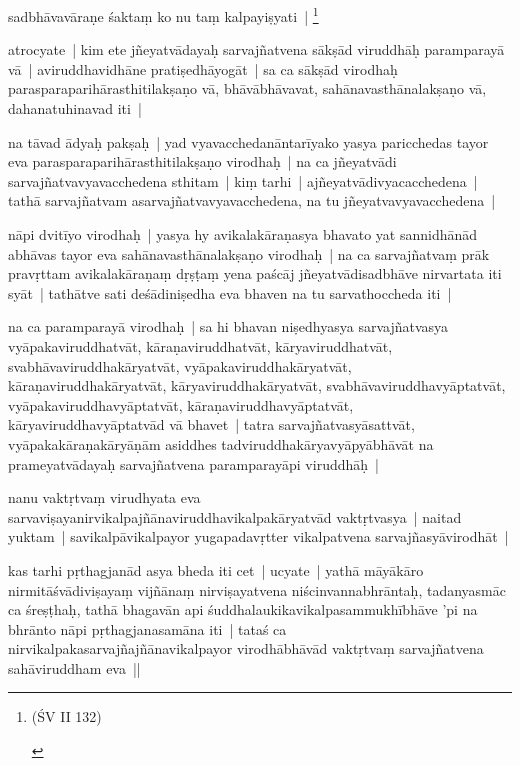 \documentclass[article,a4paper]{memoir}
\begin{document}
	  \pstart sadbhā\-vavā\-raṇe śaktaṃ ko nu taṃ kalpayiṣyati | \footnote{\begin{english}(ŚV II 132)\end{english}}
	\pend
      

	  \pstart atrocyate | kim ete jñeyatvā\-dayaḥ sarvajñatvena sā\-kṣā\-d viruddhā\-ḥ paramparayā\- vā\- | aviruddhavidhā\-ne pratiṣedhā\-yogā\-t | sa ca sā\-kṣā\-d virodhaḥ parasparaparihā\-rasthitilakṣaṇo vā\-, bhā\-vā\-bhā\-vavat, sahā\-navasthā\-nalakṣaṇo vā\-, dahanatuhinavad iti | 
	\pend
      

	  \pstart na tā\-vad ā\-dyaḥ pakṣaḥ | yad vyavacchedanā\-ntarī\-yako yasya paricchedas tayor eva parasparaparihā\-rasthitilakṣaṇo virodhaḥ | na ca jñeyatvā\-di sarvajñatvavyavacchedena sthitam | kiṃ tarhi | ajñeyatvā\-divyacacchedena | tathā\- sarvajñatvam asarvajñatvavyavacchedena, na tu jñeyatvavyavacchedena | 
	\pend
      

	  \pstart nā\-pi dvitī\-yo virodhaḥ | yasya hy avikalakā\-raṇasya bhavato yat sannidhā\-nā\-d abhā\-vas tayor eva sahā\-navasthā\-nalakṣaṇo virodhaḥ | na ca sarvajñatvaṃ prā\-k pravṛttam avikalakā\-raṇaṃ dṛṣṭaṃ yena paścā\-j jñeyatvā\-disadbhā\-ve nirvartata iti syā\-t | tathā\-tve sati deśā\-diniṣedha eva bhaven na tu sarvathoccheda iti | 
	\pend
      

	  \pstart na ca paramparayā\- virodhaḥ | sa hi bhavan niṣedhyasya sarvajñatvasya vyā\-pakaviruddhatvā\-t, kā\-raṇaviruddhatvā\-t, kā\-ryaviruddhatvā\-t, svabhā\-vaviruddhakā\-ryatvā\-t, vyā\-pakaviruddhakā\-ryatvā\-t, kā\-raṇaviruddhakā\-ryatvā\-t, kā\-ryaviruddhakā\-ryatvā\-t, svabhā\-vaviruddhavyā\-ptatvā\-t, vyā\-pakaviruddhavyā\-ptatvā\-t, kā\-raṇaviruddhavyā\-ptatvā\-t, kā\-ryaviruddhavyā\-ptatvā\-d vā\- bhavet | tatra sarvajñatvasyā\-sattvā\-t, vyā\-pakakā\-raṇakā\-ryā\-ṇā\-m asiddhes tadviruddhakā\-ryavyā\-pyā\-bhā\-vā\-t na prameyatvā\-dayaḥ sarvajñatvena paramparayā\-pi viruddhā\-ḥ | 
	\pend
      

	  \pstart nanu vaktṛtvaṃ virudhyata eva sarvaviṣayanirvikalpajñā\-naviruddhavikalpakā\-ryatvā\-d vaktṛtvasya | naitad yuktam | savikalpā\-vikalpayor yugapadavṛtter vikalpatvena sarvajñasyā\-virodhā\-t | 
	\pend
      

	  \pstart kas tarhi pṛthagjanā\-d asya bheda iti cet | ucyate | yathā\- mā\-yā\-kā\-ro nirmitā\-śvā\-diviṣayaṃ vijñā\-naṃ nirviṣayatvena niścinvannabhrā\-ntaḥ, tadanyasmā\-c ca śreṣṭhaḥ, tathā\- bhagavā\-n api śuddhalaukikavikalpasammukhī\-bhā\-ve 'pi na bhrā\-nto nā\-pi pṛthagjanasamā\-na iti | tataś ca nirvikalpakasarvajñajñā\-navikalpayor virodhā\-bhā\-vā\-d vaktṛtvaṃ sarvajñatvena sahā\-viruddham eva || 
	\pend
      
\end{document}
